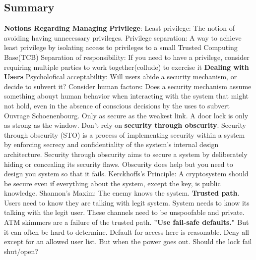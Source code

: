 \documentclass[11 pt]{scrartcl}
\begin{document}
\subsection{Summary}
\textbf{Notions Regarding Managing Privilege}:\newline
\itemnum
    \ii Least privilege: The notion of avoiding having unnecessary privileges.
    \ii Privilege separation: A way to achieve least privilege by isolating access to privileges to a small Trusted Computing Base(TCB)
    \ii Separation of responsibility: If you need to have a privilege, consider requiring multiple parties to work together(collude) to exercise it
\itemend
\textbf{Dealing with Users}\newline
\itemnum
    \ii Psycholofical acceptability: Will users abide a security mechanism, or decide to subvert it?
    \ii Consider human factors: Does a security mechanism assume something abouyt human behavior when interacting with the system that might not hold, even in the absence of conscious decisions by the uses to subvert
\itemend
Ouvrage Schoenenbourg. Only as secure as the weakest link. A door lock is only as strong as the window.\newline
Don't rely on \textbf{security through obscurity}. Security through obscurity (STO) is a process of implementing security within a system by enforcing secrecy and confidentiality of the system's internal design architecture. Security through obscurity aims to secure a system by deliberately hiding or concealing its security flaws. Obscurity does help but you need to design you system so that it fails. Kerckhoffs's Principle: A cryptosystem should be secure even if everything about the system, except the key, is public knowledge. Shannon's Maxim: The enemy knows the system.\newline
\textbf{Trusted path}. Users need to know they are talking with legit system. System needs to know its talking with the legit user. These channels need to be unspoofable and private. ATM skimmers are a failure of the trusted path.\newline
\textbf{"Use fail-safe defaults."} But it can often be hard to determine. Default for access here is reasonable. Deny all except for an allowed user list. But when the power goes out. Should the lock fail shut/open?\newline
\end{document}
